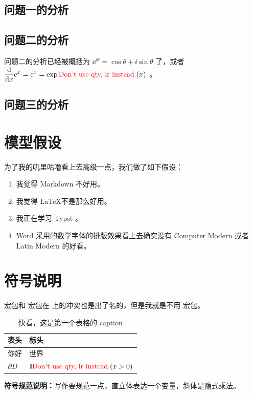 \documentclass{MMCStyle}
\begin{document}
\lipsum[4]

\subsection{问题一的分析}

\zhlipsum[2]

\subsection{问题二的分析}

问题二的分析已经被概括为 $\ee^{\ii \theta} = \cos\theta + \ii \sin\theta$ 了，或者 $\displaystyle\dv{}{x} \e^x = \ee^x = \exp\lr(x)$ 。

\subsection{问题三的分析}

\lipsum[4]

\section{模型假设}

为了我的叽里咕噜看上去高级一点，我们做了如下假设：

\begin{enumerate}
  \item 我觉得 Markdown 不好用。
  \item 我觉得 \LaTeX 不是那么好用。
  \item 我正在学习 Typst 。
  \item Word 采用的数学字体的排版效果看上去确实没有 Computer Modern 或者 Latin Modern 的好看。
\end{enumerate}



\section{符号说明}

 宏包和  宏包在  上的冲突也是出了名的，但是我就是不用  宏包。

\begin{table}[!htbp]
\centering
\caption{快看，这是第一个表格的 caption}
\label{table:symbols}
\footnotesize
\begingroup
\begin{tabularx}{\textwidth}{@{}XX@{}}
\toprule
\textbf{表头} & \textbf{标头} \\
\midrule
你好 & 世界 \\
$\partial D$ & $\mathbb{I}\lr(x>0)$ \\
\bottomrule
\end{tabularx}
\endgroup
\vspace{0.4em}

\noindent\footnotesize{\textbf{符号规范说明：}写作要规范一点，直立体表达一个变量，斜体是隐式乘法。}
\end{table}
\end{document}
